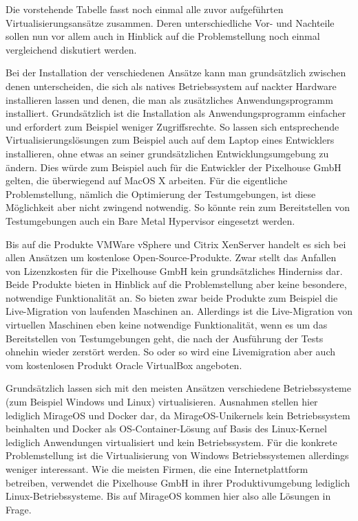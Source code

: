 Die vorstehende Tabelle fasst noch einmal alle zuvor aufgeführten Virtualisierungsansätze zusammen. Deren unterschiedliche Vor- und Nachteile sollen nun vor allem auch in Hinblick auf die Problemstellung noch einmal vergleichend diskutiert werden.

Bei der Installation der verschiedenen Ansätze kann man grundsätzlich zwischen denen unterscheiden, die sich als natives Betriebssystem auf nackter Hardware installieren lassen und denen, die man als zusätzliches Anwendungsprogramm installiert. Grundsätzlich ist die Installation als Anwendungsprogramm einfacher und erfordert zum Beispiel weniger Zugriffsrechte. So lassen sich entsprechende Virtualisierungslösungen zum Beispiel auch auf dem Laptop eines Entwicklers installieren, ohne etwas an seiner grundsätzlichen Entwicklungsumgebung zu ändern. Dies würde zum Beispiel auch für die Entwickler der Pixelhouse GmbH gelten, die überwiegend auf MacOS X arbeiten. Für die eigentliche Problemstellung, nämlich die Optimierung der Testumgebungen, ist diese Möglichkeit aber nicht zwingend notwendig. So könnte rein zum Bereitstellen von Testumgebungen auch ein Bare Metal Hypervisor eingesetzt werden.

Bis auf die Produkte VMWare vSphere und Citrix XenServer handelt es sich bei allen Ansätzen um kostenlose Open-Source-Produkte. Zwar stellt das Anfallen von Lizenzkosten für die Pixelhouse GmbH kein grundsätzliches Hinderniss dar. Beide Produkte bieten in Hinblick auf die Problemstellung aber keine besondere, notwendige Funktionalität an. So bieten zwar beide Produkte zum Beispiel die Live-Migration von laufenden Maschinen an. Allerdings ist die Live-Migration von virtuellen Maschinen eben keine notwendige Funktionalität, wenn es um das Bereitstellen von Testumgebungen geht, die nach der Ausführung der Tests ohnehin wieder zerstört werden. So oder so wird eine Livemigration aber auch vom kostenlosen Produkt Oracle VirtualBox angeboten.

Grundsätzlich lassen sich mit den meisten Ansätzen verschiedene Betriebssysteme (zum Beispiel Windows und Linux) virtualisieren. Ausnahmen stellen hier lediglich MirageOS und Docker dar, da MirageOS-Unikernels kein Betriebssystem beinhalten und Docker als OS-Container-Lösung auf Basis des Linux-Kernel lediglich Anwendungen virtualisiert und kein Betriebssystem. Für die konkrete Problemstellung ist die Virtualisierung von Windows Betriebssystemen allerdings weniger interessant. Wie die meisten Firmen, die eine Internetplattform betreiben, verwendet die Pixelhouse GmbH in ihrer Produktivumgebung lediglich Linux-Betriebssysteme. Bis auf MirageOS kommen hier also alle Lösungen in Frage.

